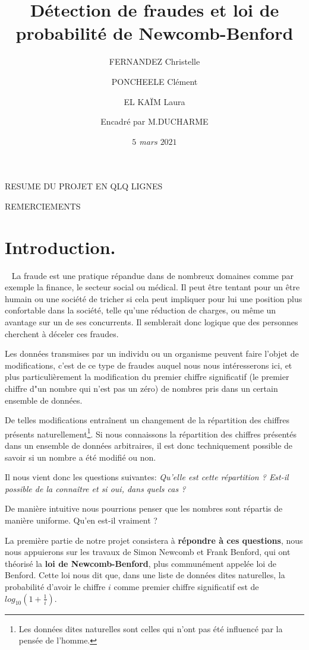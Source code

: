\documentclass[
  12pt,
]{article}
\title{Détection de fraudes et loi de probabilité de Newcomb-Benford}
\author{FERNANDEZ Christelle \and PONCHEELE Clément \and EL KAÏM
Laura \and Encadré par M.DUCHARME}
\date{\emph{\(5\) mars \(2021\)}}
\begin{document}
\maketitle

RESUME DU PROJET EN QLQ LIGNES

REMERCIEMENTS

\maketitle
\tableofcontents

\newpage

\hypertarget{introduction.}{%
\section{Introduction.}\label{introduction.}}

~ La fraude est une pratique répandue dans de nombreux domaines comme
par exemple la finance, le secteur social ou médical. Il peut être
tentant pour un être humain ou une société de tricher si cela peut
impliquer pour lui une position plus confortable dans la société, telle
qu'une réduction de charges, ou même un avantage sur un de ses
concurrents. Il semblerait donc logique que des personnes cherchent à
déceler ces fraudes.

Les données transmises par un individu ou un organisme peuvent faire
l'objet de modifications, c'est de ce type de fraudes auquel nous nous
intéresserons ici, et plus particulièrement la modification du premier
chiffre significatif (le premier chiffre d"un nombre qui n'est pas un
zéro) de nombres pris dans un certain ensemble de données.

De telles modifications entraînent un changement de la répartition des
chiffres présents naturellement\footnote{Les données dites naturelles
  sont celles qui n'ont pas été influencé par la pensée de l'homme.}. Si
nous connaissons la répartition des chiffres présentés dans un ensemble
de données arbitraires, il est donc techniquement possible de savoir si
un nombre a été modifié ou non.

Il nous vient donc les questions suivantes: \emph{Qu'elle est cette
répartition ? Est-il possible de la connaître et si oui, dans quels cas
?}

De manière intuitive nous pourrions penser que les nombres sont répartis
de manière uniforme. Qu'en est-il vraiment ?

La première partie de notre projet consistera à \textbf{répondre à ces
questions}, nous nous appuierons sur les travaux de Simon Newcomb et
Frank Benford, qui ont théorisé la \textbf{loi de Newcomb-Benford}, plus
communément appelée loi de Benford. Cette loi nous dit que, dans une
liste de données dites naturelles, la probabilité d'avoir le chiffre
\(i\) comme premier chiffre significatif est de
\(log_{10}(1 + \frac{1}{i})\).
\end{document}
